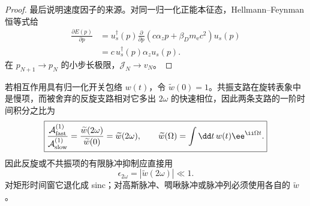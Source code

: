 \begin{proof}
最后说明速度因子的来源。对同一归一化正能本征态，Hellmann--Feynman 恒等式给
\begin{align*}
 \frac{\partial E(p)}{\partial p}
 &=u_s^\dagger(p)
 \frac{\partial}{\partial p}
 \left(c\alpha_z p+\beta_Dm_{\mathrm e} c^2\right)
 u_s(p)\\
 &=c\,u_s^\dagger(p)\alpha_z u_s(p).
\end{align*}
在 $p_{N+1}\to p_N$ 的小步长极限，$\mathcal J_N\to v_N$。
\end{proof}


若相互作用具有归一化开关包络 $w(t)$，令 $\widetilde w(0)=1$。共振支路在旋转表象中是慢项，而被舍弃的反旋支路相对它多出 $2\omega$ 的快速相位，因此两条支路的一阶时间积分之比为
\begin{equation}
\boxed{
\frac{\mathcal A_{\rm fast}^{(1)}}{\mathcal A_{\rm slow}^{(1)}}
=\frac{\widetilde w(2\omega)}{\widetilde w(0)}
=\widetilde w(2\omega),
\qquad
\widetilde w(\Omega)=\int\dd t\,w(t)\ee^{\ii\Omega t}.}
\label{eq:pinem_fast_branch_envelope_ratio}
\end{equation}
因此反旋或不共振项的有限脉冲抑制应直接用
\begin{equation}
\boxed{
\epsilon_{2\omega}=|\widetilde w(2\omega)|\ll1.}
\label{eq:feist2015_long_interaction_condition}
\end{equation}
对矩形时间窗它退化成 sinc；对高斯脉冲、啁啾脉冲或脉冲列必须使用各自的 $\widetilde w$。

